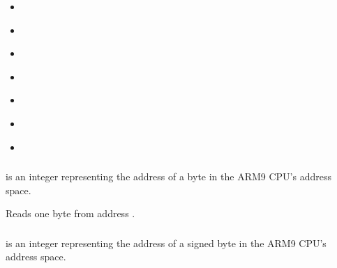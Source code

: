 \documentclass[letterpaper,10pt,english]{sphinxmanual}
\begin{document}
\begin{itemize}
\item {} 
\sphinxAtStartPar
{\hyperref[\detokenize{mods:getregister}]{}}

\item {} 
\sphinxAtStartPar
{\hyperref[\detokenize{mods:setregister}]{}}

\item {} 
\sphinxAtStartPar
{\hyperref[\detokenize{mods:vram-readword}]{}}

\item {} 
\sphinxAtStartPar
{\hyperref[\detokenize{mods:vram-writeword}]{}}

\item {} 
\sphinxAtStartPar
{\hyperref[\detokenize{mods:registerwrite}]{}}

\item {} 
\sphinxAtStartPar
{\hyperref[\detokenize{mods:registerread}]{}}

\item {} 
\sphinxAtStartPar
{\hyperref[\detokenize{mods:registerexec}]{}}

\end{itemize}


\subsubsection{}
\label{\detokenize{mods:memory-readbyte-address}}\label{\detokenize{mods:readbyte}}
\sphinxAtStartPar
{} is an integer representing the address of a byte in the ARM9 CPU’s address space.

\sphinxAtStartPar
Reads one byte from address .


\subsubsection{}
\label{\detokenize{mods:memory-readbytesigned-address}}\label{\detokenize{mods:readbytesigned}}
\sphinxAtStartPar
{} is an integer representing the address of a signed byte in the ARM9 CPU’s address space.
\end{document}
